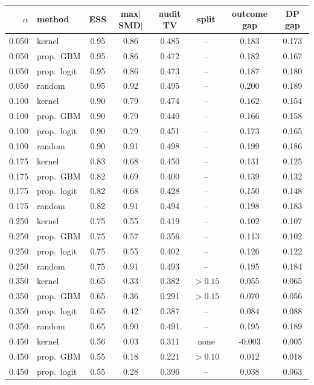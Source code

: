 \begin{tabular}{rlcccccc}
\toprule
$\alpha$ & method & ESS & max$|$SMD$|$ & audit TV & split & outcome gap & DP gap \\
\midrule
0.050 & kernel & 0.95 & 0.86 & 0.485 & -- & 0.183 & 0.173 \\
0.050 & prop.\ GBM & 0.95 & 0.86 & 0.472 & -- & 0.182 & 0.167 \\
0.050 & prop.\ logit & 0.95 & 0.86 & 0.473 & -- & 0.187 & 0.180 \\
0.050 & random & 0.95 & 0.92 & 0.495 & -- & 0.200 & 0.189 \\
\midrule
0.100 & kernel & 0.90 & 0.79 & 0.474 & -- & 0.162 & 0.154 \\
0.100 & prop.\ GBM & 0.90 & 0.79 & 0.440 & -- & 0.166 & 0.158 \\
0.100 & prop.\ logit & 0.90 & 0.79 & 0.451 & -- & 0.173 & 0.165 \\
0.100 & random & 0.90 & 0.91 & 0.498 & -- & 0.199 & 0.186 \\
\midrule
0.175 & kernel & 0.83 & 0.68 & 0.450 & -- & 0.131 & 0.125 \\
0.175 & prop.\ GBM & 0.82 & 0.69 & 0.400 & -- & 0.139 & 0.132 \\
0.175 & prop.\ logit & 0.82 & 0.68 & 0.428 & -- & 0.150 & 0.148 \\
0.175 & random & 0.82 & 0.91 & 0.494 & -- & 0.198 & 0.183 \\
\midrule
0.250 & kernel & 0.75 & 0.55 & 0.419 & -- & 0.102 & 0.107 \\
0.250 & prop.\ GBM & 0.75 & 0.57 & 0.356 & -- & 0.113 & 0.102 \\
0.250 & prop.\ logit & 0.75 & 0.55 & 0.402 & -- & 0.126 & 0.122 \\
0.250 & random & 0.75 & 0.91 & 0.493 & -- & 0.195 & 0.184 \\
\midrule
0.350 & kernel & 0.65 & 0.33 & 0.382 & $>0.15$ & 0.055 & 0.065 \\
0.350 & prop.\ GBM & 0.65 & 0.36 & 0.291 & $>0.15$ & 0.070 & 0.056 \\
0.350 & prop.\ logit & 0.65 & 0.42 & 0.387 & -- & 0.084 & 0.088 \\
0.350 & random & 0.65 & 0.90 & 0.491 & -- & 0.195 & 0.189 \\
\midrule
0.450 & kernel & 0.56 & 0.03 & 0.311 & none & -0.003 & 0.005 \\
0.450 & prop.\ GBM & 0.55 & 0.18 & 0.221 & $>0.10$ & 0.012 & 0.018 \\
0.450 & prop.\ logit & 0.55 & 0.28 & 0.396 & -- & 0.038 & 0.063 \\

\end{tabular}

